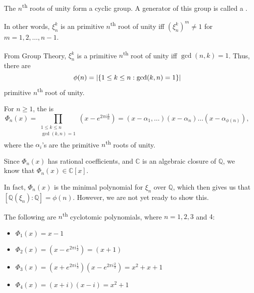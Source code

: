 \documentclass[notoc,notitlepage]{tufte-book}
\begin{document}
\begin{remark}
  The $n$\textsuperscript{th} roots of unity form a cyclic group. A generator of this
  group is called a .

  In other words, $\xi_n^k$ is an primitive $n$\textsuperscript{th} root of unity iff
  $(\xi_n^k)^m \neq 1$ for $m = 1, 2, \ldots, n - 1$.

  From Group Theory, $\xi_n^k$ is a primitive $n$\textsuperscript{th} root of unity iff
  $\gcd(n, k) = 1$. Thus, there are
  \begin{equation*}
    \phi(n) = \left| \{ 1 \leq k \leq n : \gcd(k, n) = 1 \} \right|
  \end{equation*}
  primitive $n$\textsuperscript{th} root of unity.
\end{remark}

\begin{defn}\label{defn:_n_th_cyclotomic_polynomial}
  For $n \geq 1$, the  is
  \begin{equation*}
    \Phi_n(x) = \prod_{\substack{1 \leq k \leq n \\ \gcd(k, n) = 1}} \left( x - e^{2 \pi i
    \frac{k}{n}} \right) = (x - \alpha_1, \ldots)(x - \alpha_n) \hdots (x - \alpha_{\phi(n)}),
  \end{equation*}
  where the $\alpha_i$'s are the primitive $n$\textsuperscript{th} roots of unity.
\end{defn}

\begin{remark}
  Since $\Phi_n(x)$ has rational coefficients, and $\mathbb{C}$ is an algebraic closure of
  $\mathbb{Q}$, we know that $\Phi_n(x) \in \mathbb{C}[x]$.
\end{remark}

In fact, $\Phi_n(x)$ is the minimal polynomial for $\xi_n$ over $\mathbb{Q}$, which then
gives us that $[ \mathbb{Q}(\xi_n) : \mathbb{Q} ] = \phi(n)$. However, we are not yet
ready to show this.

\begin{eg}
  The following are $n$\textsuperscript{th} cyclotomic polynomials, where $n = 1, 2, 3$
  and $4$:
  \begin{itemize}
    \item $\Phi_1(x) = x - 1$
    \item $\Phi_2(x) = \left(x - e^{2 \pi i \frac{1}{2}}\right) = (x + 1)$
    \item $\Phi_3(x) = \left(x + e^{2 \pi i \frac{1}{3}}\right)\left(x - e^{2 \pi i
      \frac{2}{3}}\right) =  x^2 + x + 1$
    \item $\Phi_4(x) = (x + i)(x - i) = x^2 + 1$
  \end{itemize}
\end{eg}
\end{document}
